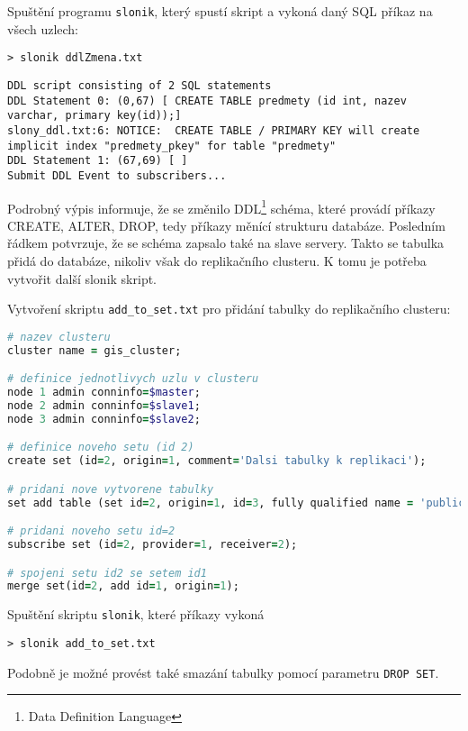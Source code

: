 Spuštění programu \texttt{slonik}, který spustí skript a vykoná daný SQL příkaz na všech uzlech: 

\begin{lstlisting}
> slonik ddlZmena.txt
\end{lstlisting}
\begin{lstlisting}[identifierstyle=\color{black},stringstyle=\color{black},keywordstyle=\color{black}]
DDL script consisting of 2 SQL statements
DDL Statement 0: (0,67) [ CREATE TABLE predmety (id int, nazev varchar, primary key(id));]
slony_ddl.txt:6: NOTICE:  CREATE TABLE / PRIMARY KEY will create implicit index "predmety_pkey" for table "predmety"
DDL Statement 1: (67,69) [ ]
Submit DDL Event to subscribers...
\end{lstlisting}

Podrobný výpis informuje, že se změnilo DDL\footnote{Data Definition Language} schéma, které provádí příkazy CREATE, ALTER, DROP, tedy příkazy měnící strukturu databáze. Posledním řádkem potvrzuje, že se schéma zapsalo také na slave servery. Takto se tabulka přidá do databáze, nikoliv však do replikačního clusteru. K tomu je potřeba vytvořit další slonik skript. 

Vytvoření skriptu \texttt{add\_to\_set.txt} pro přidání tabulky do replikačního clusteru:

\begin{lstlisting}[language=ruby]
# nazev clusteru
cluster name = gis_cluster;

# definice jednotlivych uzlu v clusteru
node 1 admin conninfo=$master;
node 2 admin conninfo=$slave1;
node 3 admin conninfo=$slave2;

# definice noveho setu (id 2)
create set (id=2, origin=1, comment='Dalsi tabulky k replikaci');

# pridani nove vytvorene tabulky
set add table (set id=2, origin=1, id=3, fully qualified name = 'public.predmet', comment='seznam predmetu');

# pridani noveho setu id=2
subscribe set (id=2, provider=1, receiver=2);

# spojeni setu id2 se setem id1
merge set(id=2, add id=1, origin=1);
\end{lstlisting}

Spuštění skriptu \texttt{slonik}, které příkazy vykoná

\begin{lstlisting}
> slonik add_to_set.txt
\end{lstlisting}

Podobně je možné provést také smazání tabulky pomocí parametru \texttt{DROP SET}. 

